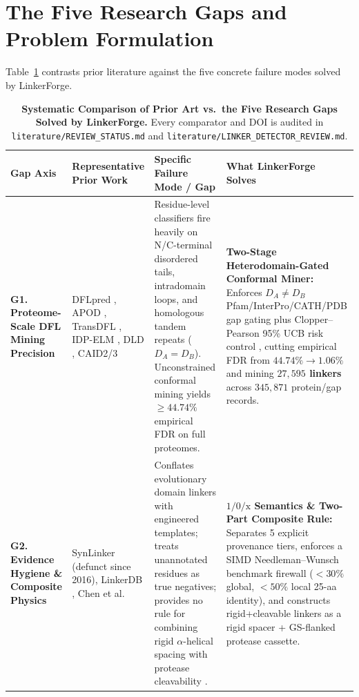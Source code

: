 \documentclass[11pt]{article}
\begin{document}
\section{The Five Research Gaps and Problem Formulation}
\label{sec:gaps}

Table~\ref{tab:gap_matrix} contrasts prior literature against the five concrete failure modes solved by LinkerForge.

\begin{table}[t]
\centering
\caption{\textbf{Systematic Comparison of Prior Art vs.\ the Five Research Gaps Solved by LinkerForge.} Every comparator and DOI is audited in \texttt{literature/REVIEW\_STATUS.md} and \texttt{literature/LINKER\_DETECTOR\_REVIEW.md}.}
\label{tab:gap_matrix}
\footnotesize
\setlength{\tabcolsep}{4.5pt}
\begin{tabular}{p{2.3cm} p{3.4cm} p{4.6cm} p{5.1cm}}
\toprule
\textbf{Gap Axis} & \textbf{Representative Prior Work} & \textbf{Specific Failure Mode / Gap} & \textbf{What LinkerForge Solves} \\
\midrule
\textbf{G1. Proteome-Scale DFL Mining Precision} &
DFLpred \cite{meng2016dflpred}, APOD \cite{peng2020apod}, TransDFL \cite{wu2023transdfl}, IDP-ELM \cite{idp_elm2024}, DLD \cite{dld2026jmb}, CAID2/3 \cite{caid2_linker2024,caid3_2025} &
Residue-level classifiers fire heavily on N/C-terminal disordered tails, intradomain loops, and homologous tandem repeats ($D_A = D_B$). Unconstrained conformal mining yields $\ge 44.74\%$ empirical FDR on full proteomes. &
\textbf{Two-Stage Heterodomain-Gated Conformal Miner:} Enforces $D_A \neq D_B$ Pfam/InterPro/CATH/PDB gap gating plus Clopper--Pearson 95\% UCB risk control \cite{bates2021rcps}, cutting empirical FDR from $44.74\% \to \mathbf{1.06\%}$ and mining \textbf{$27{,}595$ linkers} across $345{,}871$ protein/gap records. \\
\addlinespace[4pt]
\textbf{G2. Evidence Hygiene \& Composite Physics} &
SynLinker \cite{liu2015synlinker} (defunct since 2016), LinkerDB \cite{george2002analysis}, Chen et al.\ \cite{chen2013fusion} &
Conflates evolutionary domain linkers with engineered templates; treats unannotated residues as true negatives; provides no rule for combining rigid $\alpha$-helical spacing with protease cleavability \cite{hubbard1994proteolysis}. &
\textbf{$1/0/\text{x}$ Semantics \& Two-Part Composite Rule:} Separates 5 explicit provenance tiers, enforces a SIMD Needleman--Wunsch benchmark firewall ($<30\%$ global, $<50\%$ local 25-aa identity), and constructs rigid+cleavable linkers as a rigid spacer + GS-flanked protease cassette. \\

\end{tabular}
\end{table}
\end{document}
